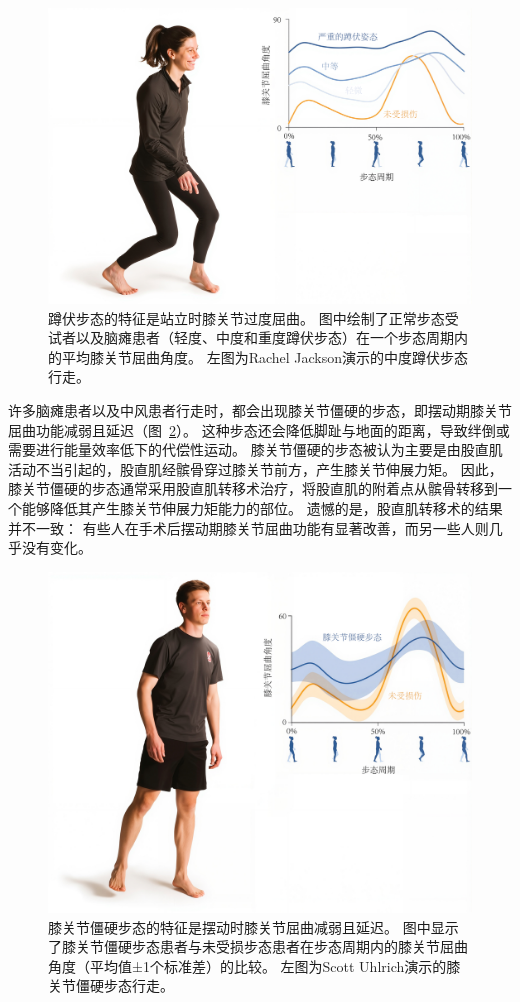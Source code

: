 \begin{figure}[!htb]
	\centering
	\includegraphics[width=1.0\linewidth]{chap2/2_21}
	\caption{蹲伏步态的特征是站立时膝关节过度屈曲。
		图中绘制了正常步态受试者以及脑瘫患者（轻度、中度和重度蹲伏步态）在一个步态周期内的平均膝关节屈曲角度。
		左图为Rachel Jackson演示的中度蹲伏步态行走\cite{steele2012compressive}。 \label{fig:2_21}}
\end{figure}


许多脑瘫患者以及中风患者行走时，都会出现膝关节僵硬的步态，即摆动期膝关节屈曲功能减弱且延迟（图~\ref{fig:2_22}）。
这种步态还会降低脚趾与地面的距离，导致绊倒或需要进行能量效率低下的代偿性运动。
膝关节僵硬的步态被认为主要是由股直肌活动不当引起的，股直肌经髌骨穿过膝关节前方，产生膝关节伸展力矩。
因此，膝关节僵硬的步态通常采用股直肌转移术治疗，将股直肌的附着点从髌骨转移到一个能够降低其产生膝关节伸展力矩能力的部位。
遗憾的是，股直肌转移术的结果并不一致：
有些人在手术后摆动期膝关节屈曲功能有显著改善，而另一些人则几乎没有变化。


\begin{figure}[!htb]
	\centering
	\includegraphics[width=1.0\linewidth]{chap2/2_22}
	\caption{膝关节僵硬步态的特征是摆动时膝关节屈曲减弱且延迟。
		图中显示了膝关节僵硬步态患者与未受损步态患者在步态周期内的膝关节屈曲角度（平均值±1个标准差）的比较。
		左图为Scott Uhlrich演示的膝关节僵硬步态行走\cite{fox2009mechanisms}。 \label{fig:2_22}}
\end{figure}


